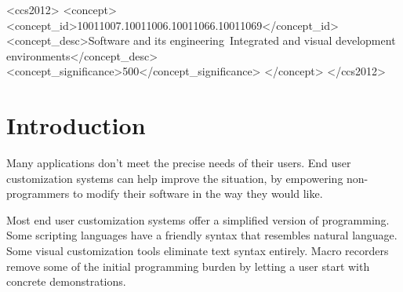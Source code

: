 \documentclass[sigplan,screen,10pt,anonymous,review]{acmart}
\begin{document}
\begin{CCSXML}
<ccs2012>
<concept>
<concept_id>10011007.10011006.10011066.10011069</concept_id>
<concept_desc>Software and its engineering~Integrated and visual development environments</concept_desc>
<concept_significance>500</concept_significance>
</concept>
</ccs2012>
\end{CCSXML}




\maketitle

\hypertarget{introduction}{%
\section{Introduction}\label{introduction}}

Many applications don't meet the precise needs of their users. End user
customization systems can help improve the situation, by empowering
non-programmers to modify their software in the way they would like.

Most end user customization systems offer a simplified version of
programming. Some scripting languages \citep{bolin2005, cook2007} have a
friendly syntax that resembles natural language. Some visual
customization tools eliminate text syntax entirely. Macro recorders
\citep{cook2007, chasins2018, anupam2000} remove some of the initial
programming burden by letting a user start with concrete demonstrations.
\end{document}
